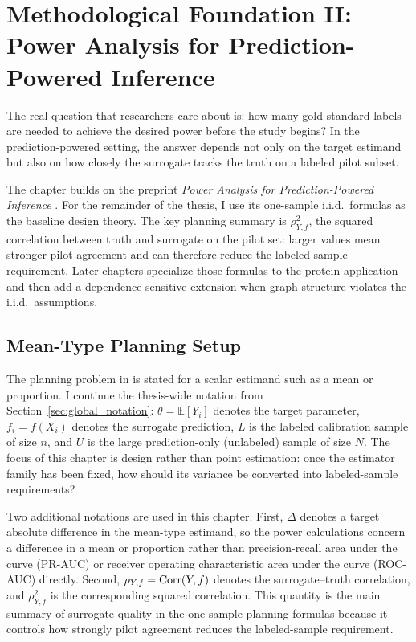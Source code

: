 \chapter{Methodological Foundation II: Power Analysis for Prediction-Powered Inference} \label{chap:foundation_power}

The real question that researchers care about is: how many gold-standard labels are needed to achieve the desired power before the study begins? In the prediction-powered setting, the answer depends not only on the target estimand but also on how closely the surrogate tracks the truth on a labeled pilot subset.

The chapter builds on the preprint \emph{Power Analysis for Prediction-Powered Inference} \parencite{ppi_power}. For the remainder of the thesis, I use its one-sample i.i.d.\ formulas as the baseline design theory. The key planning summary is \(\rho_{Y,f}^2\), the squared correlation between truth and surrogate on the pilot set: larger values mean stronger pilot agreement and can therefore reduce the labeled-sample requirement. Later chapters specialize those formulas to the protein application and then add a dependence-sensitive extension when graph structure violates the i.i.d.\ assumptions.

\section{Mean-Type Planning Setup}

The planning problem in \textcite{ppi_power} is stated for a scalar estimand such as a mean or proportion. I continue the thesis-wide notation from Section~\ref{sec:global_notation}: \(\theta = \mathbb{E}[Y_i]\) denotes the target parameter, \(f_i=f(X_i)\) denotes the surrogate prediction, \(L\) is the labeled calibration sample of size \(n\), and \(U\) is the large prediction-only (unlabeled) sample of size \(N\). The focus of this chapter is design rather than point estimation: once the estimator family has been fixed, how should its variance be converted into labeled-sample requirements?

Two additional notations are used in this chapter. First, \(\Delta\) denotes a target absolute difference in the mean-type estimand, so the power calculations concern a difference in a mean or proportion rather than precision-recall area under the curve (PR-AUC) or receiver operating characteristic area under the curve (ROC-AUC) directly. Second, \(\rho_{Y,f} = \operatorname{Corr}(Y,f)\) denotes the surrogate--truth correlation, and \(\rho_{Y,f}^2\) is the corresponding squared correlation. This quantity is the main summary of surrogate quality in the one-sample planning formulas because it controls how strongly pilot agreement reduces the labeled-sample requirement.

